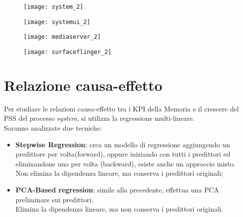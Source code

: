 \begin{minipage}{\linewidth}
  \centering
  \begin{minipage}{0.49\linewidth}
    \begin{figure}[H]
      \texttt{[image: system\_2]}
    \end{figure}
  \end{minipage}
  \begin{minipage}{0.49\linewidth}
    \begin{figure}[H]
      \texttt{[image: systemui\_2]}
    \end{figure}
  \end{minipage}
  \begin{minipage}{0.49\linewidth}
    \begin{figure}[H]
      \texttt{[image: mediaserver\_2]}
    \end{figure}
  \end{minipage}
  \begin{minipage}{0.49\linewidth}
    \begin{figure}[H]
      \texttt{[image: surfaceflinger\_2]}
    \end{figure}
  \end{minipage}
\end{minipage}
\label{minipage_trends2}

\clearpage

\section{Relazione causa-effetto}

Per studiare le relazioni causa-effetto tra i KPI della Memoria e il crescere
del PSS del processo \textit{system}, si utilizza la regressione multi-lineare.\\
Saranno analizzate due tecniche:

\begin{itemize}
  \item \textbf{Stepwise Regression}: crea un modello di regressione aggiungendo
  un predittore per volta(forward), oppure iniziando con tutti i predittori
  ed eliminandone uno per volta (backward), esiste anche un approccio misto.\\
  Non elimina la dipendenza lineare, ma conserva i predittori originali;
  \item \textbf{PCA-Based regression}: simile alla precedente, effettua
  una PCA preliminare sui predittori.\\
  Elimina la dipendenza lineare, ma non conserva i predittori originali.
\end{itemize}

